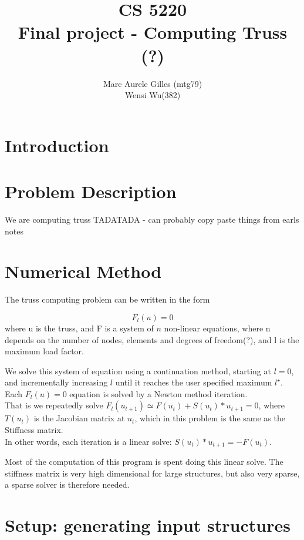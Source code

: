 \documentclass[11pt]{article}
\begin{document}
\title{CS 5220\\ Final project - Computing Truss (?)}
\author{Marc Aurele Gilles (mtg79)\\ Wensi Wu(382) }
\maketitle

\section{Introduction}


\section{Problem Description}

We are computing truss TADATADA - can probably copy paste things from earls notes


\section{Numerical Method}

The truss computing problem can be written in the form

$$F_l(u)=0$$
where u is the truss, and F is a system of $n$ non-linear equations, where n depends on the number of nodes, elements and degrees of freedom(?), and l is the maximum load factor.

We solve this system of equation using a continuation method, starting at $l=0$, and incrementally increasing $l$ until it reaches the user specified maximum $l^{\star}$. Each $F_l(u)=0$ equation is solved by a Newton method iteration.
\\
That is we repeatedly solve $F_l(u_{t+1}) \simeq F(u_t) + S(u_t)*u_{t+1} =0$, where $T(u_t)$ is the Jacobian matrix at $u_t$, which in this problem is the same as the Stiffness matrix.\\

In other words, each iteration is a linear solve:
$S(u_t)*u_{t+1}=-F(u_t)$.

Most of the computation of this program is spent doing this linear solve. The stiffness matrix is very high dimensional for large structures, but also very sparse, a sparse solver is therefore needed.

\section{Setup: generating input structures}
\end{document}
